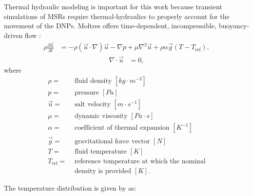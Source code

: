 Thermal hydraulic modeling is important for this work because transient simulations of \glspl{MSR} require thermal-hydraulics to properly account for the movement of the \glspl{DNP}.
Moltres offers time-dependent, incompressible, buoyancy-driven flow \cite{park_advancements_2025}:
\begin{equation}
\begin{split}
    \rho \frac{\partial \vec{u}}{\partial t} &=
    -\rho (\vec{u}
    \cdot \nabla) \vec{u} - \nabla p + \mu \nabla^2 \vec{u}
    + \rho \alpha \vec{g} \left(T - T_{\text{ref}} \right)
    \label{eq:momemtum},
\end{split}
\end{equation}
\begin{equation}
\begin{split}
    \nabla \cdot \vec{u} &= 0,
    \label{eq:divergence}
\end{split}
\end{equation}
where
\begin{align}
    \rho =& \text{ fluid density $[kg \cdot m^{-3}]$} \nonumber \\
    p =& \text{ pressure $[Pa]$} \nonumber \\
    \vec{u} =& \text{ salt velocity $[m \cdot s^{-1}]$} \nonumber \\
    \mu =& \text{ dynamic viscosity $[Pa \cdot s]$} \nonumber \\
    \alpha =& \text{ coefficient of thermal expansion $[K^{-1}]$} \nonumber \\
    \vec{g} =& \text{ gravitational force vector $[N]$} \nonumber \\
    T =& \text{ fluid temperature $[K]$} \nonumber \\
    T_{\text{ref}} =& \text{ reference temperature at which the nominal}
    \nonumber \\
    &\text{ density is provided $[K]$.} \nonumber
    \nonumber
\end{align}

The temperature distribution is given by \cite{park_advancements_2025} as:

